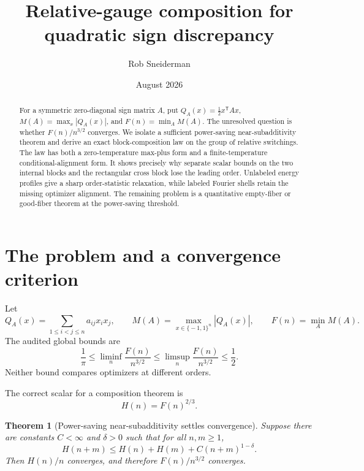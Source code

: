 \documentclass[11pt]{article}
\title{Relative-gauge composition for quadratic sign discrepancy}
\author{Rob Sneiderman}
\date{August 2026}
\newcommand{\eps}{\{\!-1,1\!\}}
\newcommand{\T}{\mathsf T}
\newtheorem{theorem}{Theorem}[section]
\theoremstyle{definition}
\theoremstyle{remark}
\begin{document}
\maketitle

\begin{abstract}
For a symmetric zero-diagonal sign matrix $A$, put
$Q_A(x)=\frac12x^{\T}Ax$, $M(A)=\max_x|Q_A(x)|$, and
$F(n)=\min_A M(A)$.  The unresolved question is whether
$F(n)/n^{3/2}$ converges.  We isolate a sufficient power-saving
near-subadditivity theorem and derive an exact block-composition law on the
group of relative switchings.  The law has both a zero-temperature max-plus
form and a finite-temperature conditional-alignment form.  It shows precisely
why separate scalar bounds on the two internal blocks and the rectangular
cross block lose the leading order.  Unlabeled energy profiles give a sharp
order-statistic relaxation, while labeled Fourier shells retain the missing
optimizer alignment.  The remaining problem is a quantitative empty-fiber or
good-fiber theorem at the power-saving threshold.
\end{abstract}

\begin{center}
\end{center}

\section{The problem and a convergence criterion}

Let
\[
 Q_A(x)=\sum_{1\le i<j\le n}a_{ij}x_ix_j,
 \qquad M(A)=\max_{x\in\eps^n}|Q_A(x)|,
 \qquad F(n)=\min_A M(A).
\]
The audited global bounds are
\[
 \frac1\pi\le\liminf_n\frac{F(n)}{n^{3/2}}
 \le\limsup_n\frac{F(n)}{n^{3/2}}\le\frac12.
\]
Neither bound compares optimizers at different orders.

The correct scalar for a composition theorem is
\[
 H(n)=F(n)^{2/3}.
\]

\begin{theorem}[Power-saving near-subadditivity settles convergence]
\label{thm:near-subadd}
Suppose there are constants $C<\infty$ and $\delta>0$ such that for all
$n,m\ge1$,
\begin{equation}
 H(n+m)\le H(n)+H(m)+C(n+m)^{1-\delta}.                 \label{eq:near-subadd}
\end{equation}
Then $H(n)/n$ converges, and therefore $F(n)/n^{3/2}$ converges.
\end{theorem}
\end{document}
